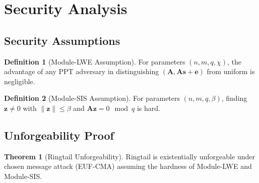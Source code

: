 \documentclass[11pt,a4paper]{article}
\theoremstyle{definition}
\newtheorem{definition}{Definition}
\newtheorem{theorem}{Theorem}
\begin{document}
\section{Security Analysis}

\subsection{Security Assumptions}

\begin{definition}[Module-LWE Assumption]
For parameters $(n, m, q, \chi)$, the advantage of any PPT adversary in distinguishing $(\mathbf{A}, \mathbf{A}\mathbf{s} + \mathbf{e})$ from uniform is negligible.
\end{definition}

\begin{definition}[Module-SIS Assumption]
For parameters $(n, m, q, \beta)$, finding $\mathbf{z} \neq 0$ with $\|\mathbf{z}\| \leq \beta$ and $\mathbf{A}\mathbf{z} = 0 \mod q$ is hard.
\end{definition}

\subsection{Unforgeability Proof}

\begin{theorem}[Ringtail Unforgeability]
Ringtail is existentially unforgeable under chosen message attack (EUF-CMA) assuming the hardness of Module-LWE and Module-SIS.
\end{theorem}
\end{document}
